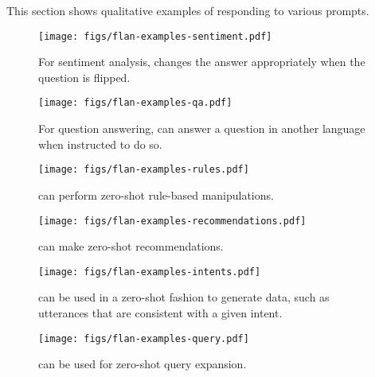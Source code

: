 This section shows qualitative examples of \flan{} responding to various prompts.

\begin{figure}[h]
    \centering
    \texttt{[image: figs/flan-examples-sentiment.pdf]}
    \vspace{-3mm}
    \caption{For sentiment analysis, \flan{} changes the answer appropriately when the question is flipped.}
    \label{fig:examples-sentiment}
\end{figure}

\begin{figure}[h]
    \centering
    \vspace{2mm}
    \texttt{[image: figs/flan-examples-qa.pdf]}
    \vspace{-3mm}
    \caption{For question answering, \flan{} can answer a question in another language when instructed to do so. \samplingexplanation{}}
    \label{fig:examples-qa}
\end{figure}

\begin{figure}[h]
    \centering
    \vspace{2mm}
    \texttt{[image: figs/flan-examples-rules.pdf]}
    \vspace{-3mm}
    \caption{\flan{} can perform zero-shot rule-based manipulations.}
    \label{fig:examples-rules}
\end{figure}

\begin{figure}[h]
    \centering
    \vspace{2mm}
    \texttt{[image: figs/flan-examples-recommendations.pdf]}
    \vspace{-3mm}
    \caption{\flan{} can make zero-shot recommendations. \samplingexplanation{}}
    \label{fig:examples-recommendations}
\end{figure}

\begin{figure}[h]
    \centering
    \vspace{2mm}
    \texttt{[image: figs/flan-examples-intents.pdf]}
    \vspace{-4mm}
    \caption{\flan{} can be used in a zero-shot fashion to generate data, such as utterances that are consistent with a given intent. \samplingexplanation{}}
    \label{fig:examples-intents}
\end{figure}

\begin{figure}[h]
    \centering
    \vspace{2mm}
    \texttt{[image: figs/flan-examples-query.pdf]}
    \vspace{-4mm}
    \caption{\flan{} can be used for zero-shot query expansion. \samplingexplanation{}}
    \label{fig:examples-query}
\end{figure}

